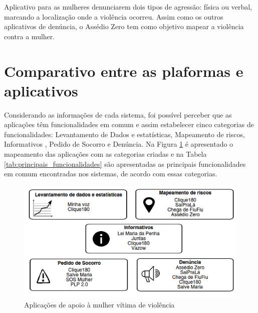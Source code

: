 Aplicativo para as mulheres denunciarem dois tipos de agressão: física ou verbal, marcando a localização 
onde a violência ocorreu. Assim como os outros aplicativos de denúncia, o Assédio Zero \cite{assediozero}
tem como objetivo mapear a violência contra a mulher.




\section{Comparativo entre as plaformas e aplicativos}

Considerando as informações de cada sistema, foi possível perceber que as aplicações têm funcionalidades
em comum e assim estabelecer cinco categorias de funcionalidades: Levantamento de Dados e estatísticas, Mapeamento de riscos, 
Informativos , Pedido de Socorro e Denúncia. Na Figura \ref{fig:sistemas_categorizados} é apresentado o mapeamento das aplicações com as categorias criadas e na 
Tabela \ref{tab:principais_funcionalidades} são apresentadas as principais funcionalidades em comum encontradas nos sistemas, 
de acordo com essas categorias.

\begin{figure}[h!]
\centering
\includegraphics[scale=0.75]{figuras/sistemas_relacionados.png}
\caption{Aplicações de apoio à mulher vítima de violência}
\label{fig:sistemas_categorizados}
\end{figure}

